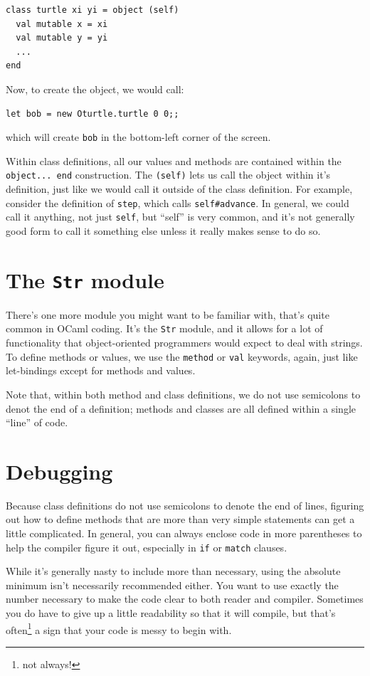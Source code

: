 \documentclass[10pt]{book}
\begin{document}
\beforeverb
\begin{verbatim}
class turtle xi yi = object (self)
  val mutable x = xi
  val mutable y = yi
  ...
end
\end{verbatim}
\afterverb

Now, to create the object, we would call:
\beforeverb
\begin{verbatim}
let bob = new Oturtle.turtle 0 0;;
\end{verbatim}
\afterverb
which will create {\tt bob} in the bottom-left corner of the screen.

Within class definitions, all our values and methods are contained
within the {\tt object... end} construction. The {\tt (self)} lets us
call the object within it's definition, just like we would call it
outside of the class definition. For example, consider the definition
of {\tt step}, which calls {\tt self\#advance}. In general, we could
call it anything, not just {\tt self}, but ``self'' is very common,
and it's not generally good form to call it something else unless it
really makes sense to do so.

\section{The {\tt Str} module}

There's one more module you might want to be familiar with, that's quite common in OCaml coding. It's the {\tt Str} module, and it allows for a lot of functionality that object-oriented programmers would expect to deal with strings.
To define methods or values, we use the {\tt method} or {\tt val} keywords, again, just like let-bindings except for methods and values.

Note that, within both method and class definitions, we do not use semicolons to denot the end of a definition; methods and classes are all defined within a single ``line'' of code.

\section{Debugging}

Because class definitions do not use semicolons to denote the end of lines, figuring out how to define methods that are more than very simple statements can get a little complicated. In general, you can always enclose code in more parentheses to help the compiler figure it out, especially in {\tt if} or {\tt match} clauses.

While it's generally nasty to include more than necessary, using the absolute minimum isn't necessarily recommended either. You want to use exactly the number necessary to make the code clear to both reader and compiler. Sometimes you do have to give up a little readability so that it will compile, but that's often\footnote{not always!} a sign that your code is messy to begin with.
\end{document}
